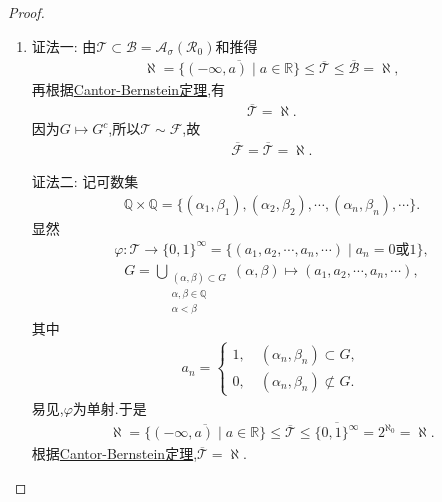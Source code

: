 \documentclass[../../main.tex]{subfiles}%
\begin{document}
\begin{proof}
\begin{enumerate}[(1)]
\item {\color{blue}证法一:} 由$\mathscr{T}\subset\mathscr{B}=\mathscr{A}_{\sigma}(\mathscr{R}_0)$和推得
\begin{align*}
\aleph=\overline{\{(-\infty,a)\mid a\in\mathbb{R}\}}\leqslant\overline{\mathscr{T}}\leqslant\overline{\mathscr{B}}=\aleph,
\end{align*}
再根据\hyperref[Set Theory-theorem:Cantor-Bernstein定理]{Cantor-Bernstein定理},有
\begin{align*}
\overline{\mathscr{T}}=\aleph.
\end{align*}
因为$G\mapsto G^c$,所以$\mathscr{T}\sim\mathscr{F}$,故
\begin{align*}
\overline{\mathscr{F}}=\overline{\mathscr{T}}=\aleph.
\end{align*}

{\color{blue}证法二:} 记可数集
\begin{align*}
\mathbb{Q}\times\mathbb{Q}=\{(\alpha_1,\beta_1),(\alpha_2,\beta_2),\cdots,(\alpha_n,\beta_n),\cdots\}.
\end{align*}
显然
\begin{align*}
\varphi:\mathscr{T}\to\{0,1\}^{\infty}=\{(a_1,a_2,\cdots,a_n,\cdots)\mid a_n=0\text{或}1\},
\end{align*}
\begin{align*}
G=\bigcup\limits_{\substack{(\alpha,\beta)\subset G\\ \alpha,\beta\in\mathbb{Q}\\ \alpha<\beta}}(\alpha,\beta)\mapsto(a_1,a_2,\cdots,a_n,\cdots),
\end{align*}
其中
\begin{align*}
a_n=\begin{cases}
1,\quad (\alpha_n,\beta_n)\subset G,\\
0,\quad (\alpha_n,\beta_n)\not\subset G.
\end{cases}
\end{align*}
易见,$\varphi$为单射.于是
\begin{align*}
\aleph=\overline{\{(-\infty,a)\mid a\in\mathbb{R}\}}\leqslant\overline{\mathscr{T}}\leqslant\overline{\{0,1\}^{\infty}}=2^{\aleph_0}=\aleph.
\end{align*}
根据\hyperref[Set Theory-theorem:Cantor-Bernstein定理]{Cantor-Bernstein定理},$\overline{\mathscr{T}}=\aleph$.


\end{enumerate}
\end{proof}
\end{document}
